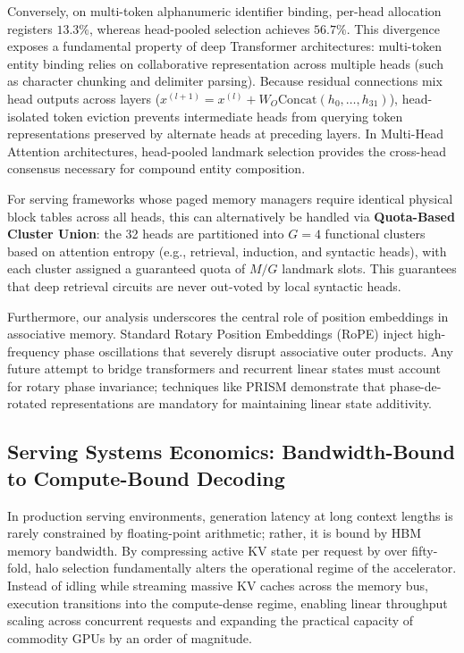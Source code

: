 \documentclass[11pt,a4paper]{article}
\begin{document}
Conversely, on multi-token alphanumeric identifier binding, per-head allocation registers $13.3\%$, whereas head-pooled selection achieves $56.7\%$. This divergence exposes a fundamental property of deep Transformer architectures: multi-token entity binding relies on collaborative representation across multiple heads (such as character chunking and delimiter parsing). Because residual connections mix head outputs across layers ($x^{(l+1)} = x^{(l)} + W_O \text{Concat}(h_0, \dots, h_{31})$), head-isolated token eviction prevents intermediate heads from querying token representations preserved by alternate heads at preceding layers. In Multi-Head Attention architectures, head-pooled landmark selection provides the cross-head consensus necessary for compound entity composition.

For serving frameworks whose paged memory managers require identical physical block tables across all heads, this can alternatively be handled via \textbf{Quota-Based Cluster Union}: the 32 heads are partitioned into $G=4$ functional clusters based on attention entropy (e.g., retrieval, induction, and syntactic heads), with each cluster assigned a guaranteed quota of $M/G$ landmark slots. This guarantees that deep retrieval circuits are never out-voted by local syntactic heads.

Furthermore, our analysis underscores the central role of position embeddings in associative memory. Standard Rotary Position Embeddings (RoPE) inject high-frequency phase oscillations that severely disrupt associative outer products. Any future attempt to bridge transformers and recurrent linear states must account for rotary phase invariance; techniques like PRISM demonstrate that phase-de-rotated representations are mandatory for maintaining linear state additivity.

\subsection{Serving Systems Economics: Bandwidth-Bound to Compute-Bound Decoding}
In production serving environments, generation latency at long context lengths is rarely constrained by floating-point arithmetic; rather, it is bound by HBM memory bandwidth. By compressing active KV state per request by over fifty-fold, halo selection fundamentally alters the operational regime of the accelerator. Instead of idling while streaming massive KV caches across the memory bus, execution transitions into the compute-dense regime, enabling linear throughput scaling across concurrent requests and expanding the practical capacity of commodity GPUs by an order of magnitude.
\end{document}
